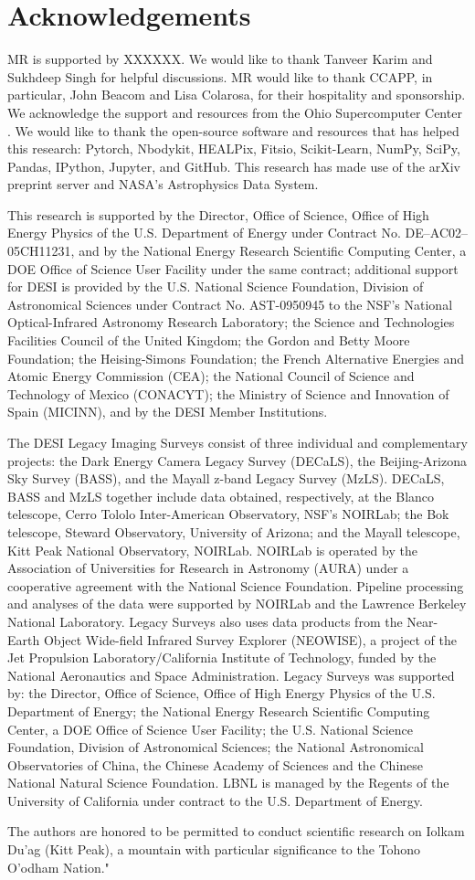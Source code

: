 \section*{Acknowledgements}
MR is supported by XXXXXX. We would like to thank Tanveer Karim and Sukhdeep Singh for helpful discussions. MR would like to thank CCAPP, in particular, John Beacom and Lisa Colarosa, for their hospitality and sponsorship. We acknowledge the support and resources from the Ohio Supercomputer Center \citep[OSC;][]{OhioSupercomputerCenter1987}. We would like to thank the open-source software and resources that has helped this research: Pytorch, Nbodykit, HEALPix, Fitsio, Scikit-Learn, NumPy, SciPy, Pandas, IPython, Jupyter, and GitHub. This research has made use of the arXiv preprint server and NASA’s Astrophysics Data System.


This research is supported by the Director, Office of Science, Office of High Energy Physics of the U.S. Department of Energy under Contract No. DE–AC02–05CH11231, and by the National Energy Research Scientific Computing Center, a DOE Office of Science User Facility under the same contract; additional support for DESI is provided by the U.S. National Science Foundation, Division of Astronomical Sciences under Contract No. AST-0950945 to the NSF’s National Optical-Infrared Astronomy Research Laboratory; the Science and Technologies Facilities Council of the United Kingdom; the Gordon and Betty Moore Foundation; the Heising-Simons Foundation; the French Alternative Energies and Atomic Energy Commission (CEA); the National Council of Science and Technology of Mexico (CONACYT); the Ministry of Science and Innovation of Spain (MICINN), and by the DESI Member Institutions.

The DESI Legacy Imaging Surveys consist of three individual and complementary projects: the Dark Energy Camera Legacy Survey (DECaLS), the Beijing-Arizona Sky Survey (BASS), and the Mayall z-band Legacy Survey (MzLS). DECaLS, BASS and MzLS together include data obtained, respectively, at the Blanco telescope, Cerro Tololo Inter-American Observatory, NSF’s NOIRLab; the Bok telescope, Steward Observatory, University of Arizona; and the Mayall telescope, Kitt Peak National Observatory, NOIRLab. NOIRLab is operated by the Association of Universities for Research in Astronomy (AURA) under a cooperative agreement with the National Science Foundation. Pipeline processing and analyses of the data were supported by NOIRLab and the Lawrence Berkeley National Laboratory. Legacy Surveys also uses data products from the Near-Earth Object Wide-field Infrared Survey Explorer (NEOWISE), a project of the Jet Propulsion Laboratory/California Institute of Technology, funded by the National Aeronautics and Space Administration. Legacy Surveys was supported by: the Director, Office of Science, Office of High Energy Physics of the U.S. Department of Energy; the National Energy Research Scientific Computing Center, a DOE Office of Science User Facility; the U.S. National Science Foundation, Division of Astronomical Sciences; the National Astronomical Observatories of China, the Chinese Academy of Sciences and the Chinese National Natural Science Foundation. LBNL is managed by the Regents of the University of California under contract to the U.S. Department of Energy. 

The authors are honored to be permitted to conduct scientific research on Iolkam Du’ag (Kitt Peak), a mountain with particular significance to the Tohono O’odham Nation."
